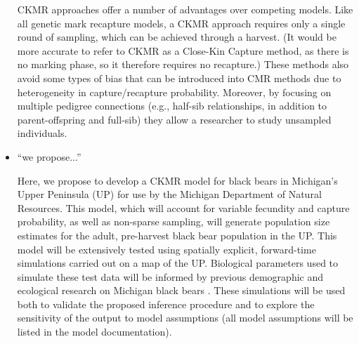 \documentclass[12pt]{article}
\newcommand{\gb}[1]{{\color{blue}{#1}}}
\begin{document}
\begin{itemize}
CKMR approaches offer a number of advantages 
over competing models. 
Like all genetic mark recapture models, 
a CKMR approach requires only a single round of sampling, 
which can be achieved through a harvest.
(It would be more accurate to refer to CKMR as 
a Close-Kin Capture method, 
as there is no marking phase, 
so it therefore requires no recapture.)
These methods also avoid some types of bias 
that can be introduced into CMR methods due to 
heterogeneity in capture/recapture probability.
Moreover, by focusing on multiple pedigree connections 
(e.g., half-sib relationships, 
in addition to parent-offspring and full-sib) 
they allow a researcher to study unsampled individuals.

\item ``we propose...'' 

Here, we propose to develop a \gb{spatial} CKMR model 
for black bears in Michigan's Upper Peninsula (UP) 
for use by the Michigan Department of Natural Resources.
This model, which will account for 
variable fecundity and capture probability, 
as well as non-sparse sampling, 
will generate population size estimates 
for the adult, pre-harvest black bear population in the UP. 
\gb{We will extend existing CKMR models 
to incorporate geography; 
in addition to generating estimates of total population size, 
this spatial model will also generate maps of estimated 
population density, 
and has the potential to shed light 
on other demographic parameters as well.}
This model will be extensively tested using spatially explicit,  
forward-time simulations carried out on a map of the UP. 
\gb{peter add text here.}
Biological parameters used to simulate these test data 
will be informed by previous demographic and ecological 
research on Michigan black bears \citep{Moore_etal_2014}.
These simulations will be used both to 
validate the proposed inference procedure 
and to explore the sensitivity of the output to model assumptions 
(all model assumptions will be listed in the model documentation).


\end{itemize}
\end{document}
